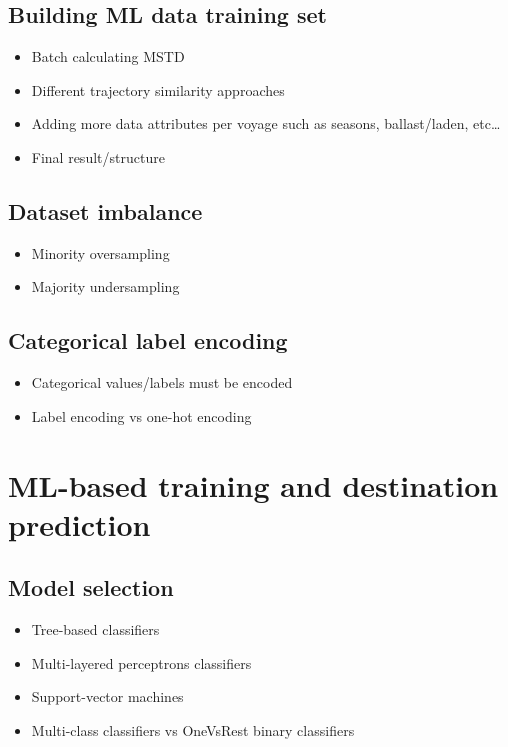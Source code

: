 \subsection{Building ML data training set}

\begin{itemize}
    \item Batch calculating MSTD
    \item Different trajectory similarity approaches
    \item Adding more data attributes per voyage such as seasons, ballast/laden, etc\ldots
    \item Final result/structure
\end{itemize}

\subsection{Dataset imbalance}

\begin{itemize}
    \item Minority oversampling
    \item Majority undersampling
\end{itemize}

\subsection{Categorical label encoding}

\begin{itemize}
    \item Categorical values/labels must be encoded
    \item Label encoding vs one-hot encoding
\end{itemize}

\section{ML-based training and destination prediction}

\subsection{Model selection}

\begin{itemize}
    \item Tree-based classifiers
    \item Multi-layered perceptrons classifiers
    \item Support-vector machines
    \item Multi-class classifiers vs OneVsRest binary classifiers
\end{itemize}

